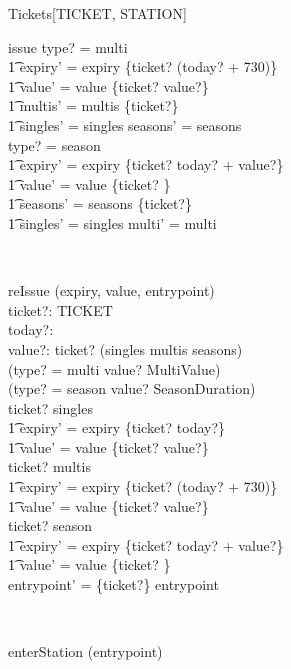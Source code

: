 \begin{class}{Tickets}[TICKET, STATION]
\begin{schema}{issue}
type? = multi \implies\\
\t1 expiry' = expiry \cup \{ticket? \mapsto (today? + 730)\} \land \\ 
\t1 value' = value \cup \{ticket? \mapsto value?\} \land \\ 
\t1 multis' = multis \cup \{ticket?\} \land \\ 
\t1 singles' = singles \land seasons' = seasons\\
type? = season \implies\\
\t1 expiry' = expiry \cup \{ticket? \mapsto today? + value?\} \land \\ 
\t1 value' = value \cup \{ticket? \} \land \\ 
\t1 seasons' = seasons \cup \{ticket?\} \land \\ 
\t1 singles' = singles \land  multi' = multi
\end{schema}
\\ 
\begin{schema}{reIssue}
\Delta (expiry, value, entrypoint)\\
ticket?: TICKET \\ 
today?:  \nat  \\ 
value?:  \nat  
\where
 ticket? \in (singles \cup multis \cup seasons) \land\\
     (type? = multi \implies value? \in MultiValue) \land\\
     (type? = season \implies value? \in SeasonDuration)\\
ticket? \in singles \implies\\
\t1 expiry' = expiry \oplus \{ticket? \mapsto today?\} \land \\ 
\t1 value' = value \oplus \{ticket? \mapsto value?\}\\ 
ticket? \in multis \implies\\
\t1 expiry' = expiry \oplus  \{ticket? \mapsto (today? + 730)\} \land \\ 
\t1 value' = value \oplus \{ticket? \mapsto value?\} \\ 
ticket? \in season \implies\\
\t1 expiry' = expiry \oplus \{ticket? \mapsto today? + value?\} \land \\ 
\t1 value' = value \oplus \{ticket? \}\\
entrypoint' = \{ticket?\} \ndres entrypoint
\end{schema} \\ 
\begin{schema}{enterStation}
\Delta (entrypoint)\\

\end{schema}
\end{class}
